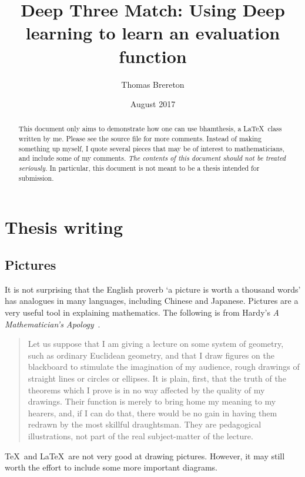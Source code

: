 \documentclass{bhamthesis}
\title{Deep Three Match: Using Deep learning to learn an evaluation function}
\author{Thomas Brereton}
\date{August 2017}  %
\makeatletter
\theoremstyle{definition}
\newcommand{\clsname}{\textsf{bhamthesis}}
\newcommand{\bktitle}[1]{\textit{#1}}
\newcommand{\makecrestcover}{%
\begin{titlepage}
\centering\singlespacing
\vspace*{1cm}
{\huge\bfseries University of Birmingham\par}
\vspace*{2cm}
\texttt{[image: crest]}\par
\vspace*{\stretch{1}}
{\Huge\bfseries
\@author\par
\vspace{1cm}
\@title\par}
\vspace*{\stretch{1}}
{\Large\@date\par}
\end{titlepage}
}
\makeatother
\begin{document}
\frontmatter

\maketitle


\begin{abstract}
 This document only aims to demonstrate how one can use \clsname,
 a \LaTeX\ class written by me.  Please see the source file for
 more comments.  Instead of making something up myself, I quote
 several pieces that may be of interest to mathematicians, and
 include some of my comments. \emph{The contents of this document
 should not be treated seriously.}  In particular, this document
 is not meant to be a thesis intended for submission.
\end{abstract}

\tableofcontents


\mainmatter
\chapter{Thesis writing}
\section{Pictures}
It is not surprising that the English proverb `a picture is worth
a thousand words' has analogues in many languages, including
Chinese and Japanese.  Pictures are a very useful tool in
explaining mathematics.  The following is from Hardy's \bktitle{A
Mathematician's Apology}~\cite[\S23]{book:math-apol}.
\begin{quotation}
 Let us suppose that I am giving a lecture on some system of
 geometry, such as ordinary Euclidean geometry, and that I draw
 figures on the blackboard to stimulate the imagination of my
 audience, rough drawings of straight lines or circles or
 ellipses.  It is plain, first, that the truth of the theorems
 which I prove is in no way affected by the quality of my
 drawings.  Their function is merely to bring home my meaning
 to my hearers, and, if I can do that, there would be no gain in
 having them redrawn by the most skillful draughtsman.  They are
 pedagogical illustrations, not part of the real subject-matter
 of the lecture.
\end{quotation}
\TeX\ and \LaTeX\ are not very good at drawing pictures.  However,
it may still worth the effort to include some more important
diagrams.
\end{document}

